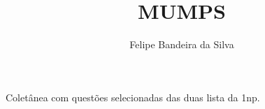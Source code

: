 \documentclass[paper=a4, fontsize=11pt]{article}
\title{MUMPS}
\author{Felipe Bandeira da Silva}
\begin{document}
\maketitle

Coletânea com questões selecionadas das duas lista da 1np.


\end{document}
